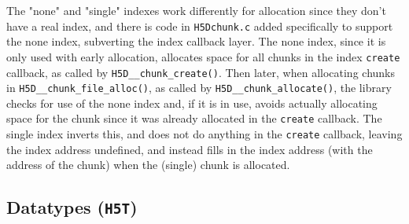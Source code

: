 \begin{itemize}
The "none" and "single" indexes work differently for allocation since they don't have a real index, and there is code in \texttt{H5Dchunk.c} added specifically to support the none index, subverting the index callback layer. The none index, since it is only used with early allocation, allocates space for all chunks in the index \texttt{create} callback, as called by \texttt{H5D\_\_chunk\_create()}. Then later, when allocating chunks in \texttt{H5D\_\_chunk\_file\_alloc()}, as called by \texttt{H5D\_\_chunk\_allocate()}, the library checks for use of the none index and, if it is in use, avoids actually allocating space for the chunk since it was already allocated in the \texttt{create} callback. The single index inverts this, and does not do anything in the \texttt{create} callback, leaving the index address undefined, and instead fills in the index address (with the address of the chunk) when the (single) chunk is allocated.

\end{itemize}


\subsection{Datatypes (\texttt{H5T})}



